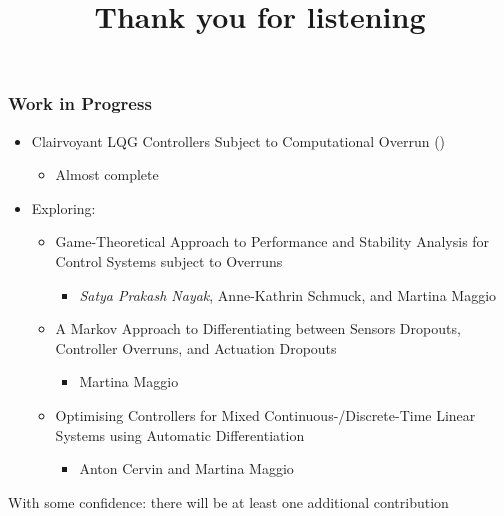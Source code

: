 \begin{frame}
    \frametitle{Work in Progress}
    \begin{itemize}
        \item Clairvoyant LQG Controllers Subject to Computational Overrun ()
            \begin{itemize}
                \item Almost complete
            \end{itemize}
        \item Exploring:
            \begin{itemize}
                \item Game-Theoretical Approach to Performance and Stability Analysis for Control Systems subject to Overruns
                    \begin{itemize}
                        \item \emph{Satya Prakash Nayak}, Anne-Kathrin Schmuck, and Martina Maggio
                    \end{itemize}
                \item A Markov Approach to Differentiating between Sensors Dropouts, Controller Overruns, and Actuation Dropouts
                    \begin{itemize}
                        \item Martina Maggio
                    \end{itemize}
                \item Optimising Controllers for Mixed Continuous-/Discrete-Time Linear Systems using Automatic Differentiation
                    \begin{itemize}
                        \item Anton Cervin and Martina Maggio
                    \end{itemize}
            \end{itemize}
    \end{itemize}
    With some confidence: there will be at least one additional contribution
\end{frame}

\title[Preperatory Seminar]{%
    {\Huge Thank you for listening}
}
\author[Nils Vreman]{}
\date[]{}
\notitlelogo{}
